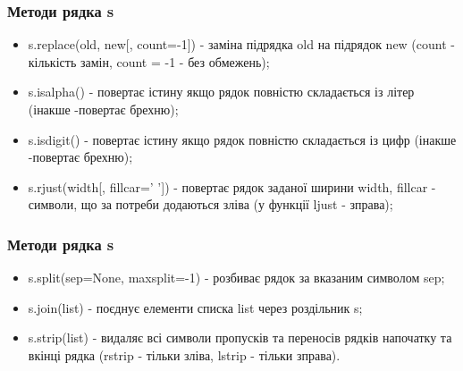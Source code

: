 \begin{frame}
\frametitle{Методи рядка s}
\begin{itemize}
 \item s.replace(old, new[, count=-1]) - заміна підрядка old на підрядок new (count - кількість замін, count = -1 - без обмежень);
 \item s.isalpha() - повертає істину якщо рядок повністю складається із літер (інакше -повертає брехню);
 \item s.isdigit() - повертає істину якщо рядок повністю складається із цифр (інакше -повертає брехню);
 \item s.rjust(width[, fillcar=' ']) - повертає рядок заданої ширини width, fillcar - символи, що за потреби додаються зліва (у функції ljust - зправа);
\end{itemize}
\end{frame}

\begin{frame}
\frametitle{Методи рядка s}
\begin{itemize}
 \item s.split(sep=None, maxsplit=-1) - розбиває рядок за вказаним символом sep;
 \item s.join(list) - поєднує елементи списка list через роздільник s;
 \item s.strip(list) - видаляє всі символи пропусків та переносів рядків напочатку та вкінці рядка (rstrip - тільки зліва, lstrip - тільки зправа).
\end{itemize}
\end{frame}


